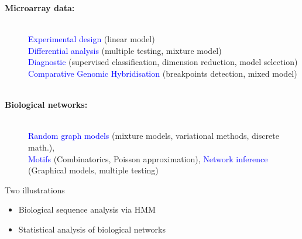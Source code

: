 \documentclass[pdf,mia,noFooter,slideColor,colorBG]{prosper}
\newcommand{\emphase}[1]{{\textcolor{blue}{{#1}}}}
\renewcommand{\paragraph}[1]{{\large \bf  #1}}
\begin{document}
\begin{slide}{}%
\vspace{-0.75cm}
\begin{description}
\item[\paragraph{Microarray data:}] ~\\
  \emphase{Experimental design} (linear model) \\ 
  \emphase{Differential analysis} (multiple testing, mixture model) \\
  \emphase{Diagnostic} (supervised classification, dimension reduction, model
  selection) \\ 
  \emphase{Comparative Genomic Hybridisation} (breakpoints
  detection, mixed model)\\
  ~\\
\item[\paragraph{Biological networks:}] ~\\
  \emphase{Random graph models}
  (mixture models, variational methods, discrete math.), \\
  \emphase{Motifs} (Combinatorics, Poisson approximation), 
  \emphase{Network inference} (Graphical models, multiple testing)
\end{description}
\end{slide}

\begin{slide}{Two illustrations}
\begin{itemize}
\item Biological sequence analysis via HMM
  
\item Statistical analysis of biological networks
\end{itemize}
\end{slide}
\end{document}
